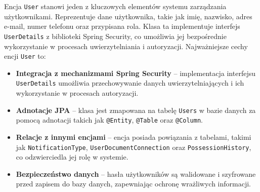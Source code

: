 Encja \texttt{User} stanowi jeden z kluczowych elementów systemu zarządzania użytkownikami. Reprezentuje dane użytkownika, takie jak imię, nazwisko, adres e-mail, numer telefonu oraz przypisana rola. Klasa ta implementuje interfejs \texttt{UserDetails} z biblioteki Spring Security, co umożliwia jej bezpośrednie wykorzystanie w procesach uwierzytelniania i autoryzacji. Najważniejsze cechy encji \texttt{User} to:
\begin{itemize}
    \item \textbf{Integracja z mechanizmami Spring Security} -- implementacja interfejsu \texttt{UserDetails} umożliwia przechowywanie danych uwierzytelniających i ich wykorzystanie w procesach autoryzacji.
    \item \textbf{Adnotacje JPA} -- klasa jest zmapowana na tabelę \texttt{Users} w bazie danych za pomocą adnotacji takich jak \texttt{@Entity}, \texttt{@Table} oraz \texttt{@Column}.
    \item \textbf{Relacje z innymi encjami} -- encja posiada powiązania z tabelami, takimi jak \texttt{NotificationType}, \texttt{UserDocumentConnection} oraz \texttt{PossessionHistory}, co odzwierciedla jej rolę w systemie.
    \item \textbf{Bezpieczeństwo danych} -- hasła użytkowników są walidowane i szyfrowane przed zapisem do bazy danych, zapewniając ochronę wrażliwych informacji.
\end{itemize}

